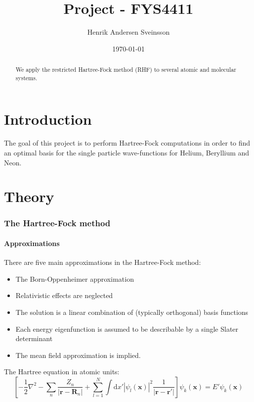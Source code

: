 \documentclass[a4paper,10pt, twocolumn, pre]{revtex4}
\newcommand{\rvec}{\mathbf{r}}
\newcommand{\Rvec}{\mathbf{R}}
\newcommand{\xvec}{\mathbf{x}}
\newcommand{\dd}{\mathrm{d}}
\begin{document}
\title{Project - FYS4411}
\author{Henrik Andersen Sveinsson}
\date{\today}

\begin{abstract}
We apply the restricted Hartree-Fock method (RHF) to several atomic and molecular systems.
\end{abstract}
\maketitle


\part{Introduction}
The goal of this project is to perform Hartree-Fock computations in order to find an optimal basis for the single particle wave-functions for Helium, Beryllium and Neon.

\part{Theory}
\section{The Hartree-Fock method}

\subsection{Approximations}
There are five main approximations in the Hartree-Fock method:
\begin{itemize}
 \item The Born-Oppenheimer approximation
 \item Relativistic effects are neglected
 \item The solution is a linear combination of (typically orthogonal) basis functions
 \item Each energy eigenfunction is assumed to be describable by a single Slater determinant
 \item The mean field approximation is implied. 
\end{itemize}

The Hartree equation in atomic units:
\begin{equation}
 \left[ -\frac{1}{2}\nabla^2 -\sum_n \frac{Z_n}{|\rvec -\Rvec_n|} + 
 \sum_{l=1}^N \int \dd x' |\psi_l(\xvec)|^2 \frac{1}{|\rvec -\rvec'|}\right] \psi_k(\xvec) 
 = E' \psi_k (\xvec)
\end{equation}
\end{document}
